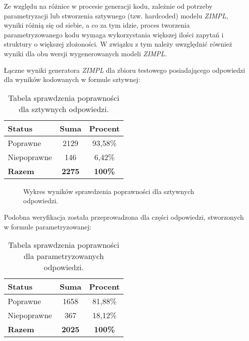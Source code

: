 Ze względu na różnice w procesie generacji kodu, zależnie od potrzeby parametryzacji lub stworzenia sztywnego (tzw. hardcoded) modelu  \textit{ZIMPL}, wyniki różnią się od siebie, a co za tym idzie, proces tworzenia parametryzowanego kodu wymaga wykorzystania większej ilości zapytań i struktury o większej złożoności. W związku z tym należy uwzględnić również wyniki dla obu wersji wygenerowanych modeli  \textit{ZIMPL}.

Łączne wyniki generatora  \textit{ZIMPL} dla zbioru testowego posiadającego odpowiedzi dla wyników kodowanych w formule sztywnej:

\begin{table}[ht]
\caption{Tabela sprawdzenia poprawności dla sztywnych odpowiedzi.}\label{tab:tabela2}
\centering%
\begin{tabular}{|l|c|c|}
\hline
\textbf{Status} & \textbf{Suma} & \textbf{Procent} \\
\hline
Poprawne & 2129 & 93,58\% \\
\hline
Niepoprawne & 146 & 6,42\% \\
\hline
\textbf{Razem} & \textbf{2275} & \textbf{100\%} \\
\hline
\end{tabular}
\end{table}

\begin{figure}[H]
\centering
{}
\caption{Wykres wyników sprawdzenia poprawności dla sztywnych odpowiedzi.}\label{rys:plama2b}
\end{figure}

Podobna weryfikacja została przeprowadzona dla części odpowiedzi, stworzonych w formule parametryzowanej:

\begin{table}[ht]
\caption{Tabela sprawdzenia poprawności dla parametryzowanych odpowiedzi.}\label{tab:tabela3}
\centering%
\begin{tabular}{|l|c|c|}
\hline
\textbf{Status} & \textbf{Suma} & \textbf{Procent} \\
\hline
Poprawne & 1658 & 81,88\% \\
\hline
Niepoprawne & 367 & 18,12\% \\
\hline
\textbf{Razem} & \textbf{2025} & \textbf{100\%} \\
\hline
\end{tabular}
\end{table}

